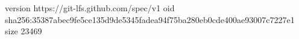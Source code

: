 version https://git-lfs.github.com/spec/v1
oid sha256:35387abec9fe5ce135d9de5345fadea94f75ba280eb0cde400ae93007c7227e1
size 23469
